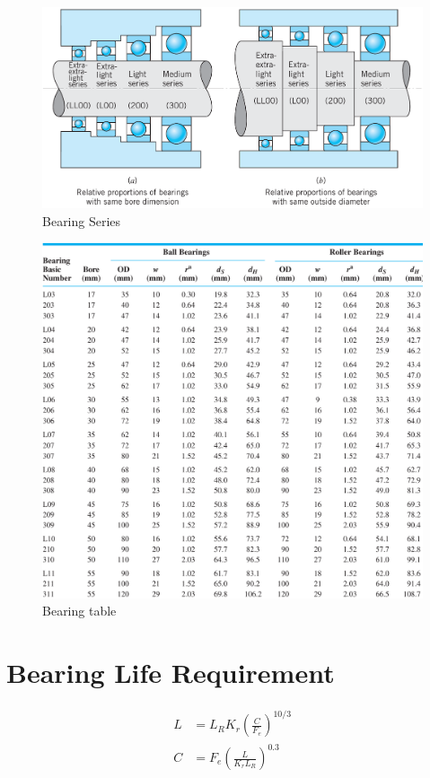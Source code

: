 \documentclass[a4paper,openany]{tufte-book}
\begin{document}
\begin{figure}[htbp]
\centering
\includegraphics[width=.9\linewidth]{./pictures/Bearings/bearing-series.png}
\caption{Bearing Series}
\end{figure}

\begin{figure}[htbp]
\centering
\includegraphics[width=.9\linewidth]{./pictures/Bearings/bearing-table.png}
\caption{Bearing table}
\end{figure}

\section{Bearing Life Requirement}
\label{sec:org1e31e12}

\begin{align}
    L &= L_R K_r \left( \frac{C}{F_e} \right)^{10/3} \\
    C &= F_e \left( \frac{L}{K_r L_R} \right)^{0.3}
\end{align}
\end{document}
